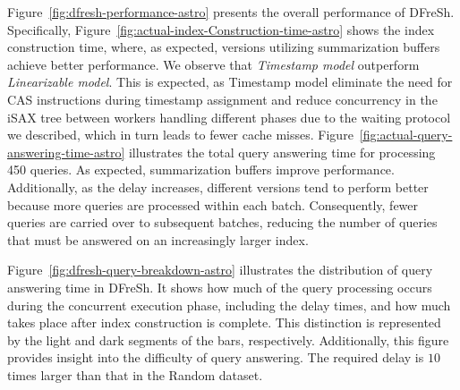Figure~\ref{fig:dfresh-performance-astro} presents the overall performance
of DFreSh. Specifically, Figure~\ref{fig:actual-index-Construction-time-astro}
shows the index construction time, where, as expected, versions utilizing
summarization buffers achieve better performance. We observe that
\textit{Timestamp model} outperform \textit{Linearizable model}. 
This is expected, as Timestamp model eliminate the need for CAS instructions
during timestamp assignment and reduce concurrency in the iSAX tree between
workers handling different phases due to the waiting protocol we described,
which in turn leads to fewer cache misses. 
Figure~\ref{fig:actual-query-answering-time-astro} illustrates the total query
answering time for processing 450 queries. As expected, summarization buffers
improve performance. Additionally, as the delay increases, different versions
tend to perform better because more queries are processed within each batch.
Consequently, fewer queries are carried over to subsequent batches, reducing
the number of queries that must be answered on an increasingly larger index.

%
Figure~\ref{fig:dfresh-query-breakdown-astro} illustrates the distribution of query
answering time in DFreSh. It shows how much of the query processing occurs during the
concurrent execution phase, including the delay times, and how much takes place after
index construction is complete. This distinction is represented by the light and dark
segments of the bars, respectively. Additionally, this figure provides insight into
the difficulty of query answering. The required delay is $10$ times larger than that 
in the Random dataset.

